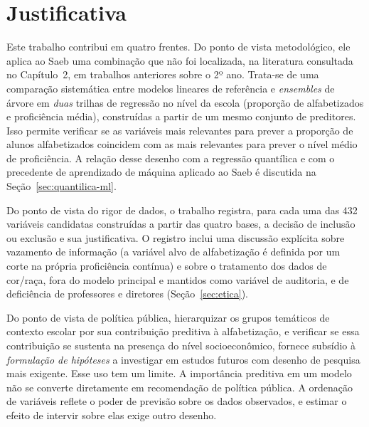 \section{Justificativa}
\label{sec:justificativa}

Este trabalho contribui em quatro frentes. Do ponto de vista
metodológico, ele aplica ao Saeb uma combinação
que não foi localizada, na literatura consultada no Capítulo~2, em
trabalhos anteriores sobre o 2º ano. Trata-se de uma comparação
sistemática entre modelos lineares de referência e \textit{ensembles} de
árvore em \emph{duas} trilhas de regressão no nível da escola (proporção de
alfabetizados e proficiência média), construídas a partir de um mesmo
conjunto de preditores. Isso permite verificar se as variáveis mais
relevantes para prever a proporção de alunos alfabetizados coincidem com as
mais relevantes para prever o nível médio de proficiência. A relação desse
desenho com a regressão quantílica \cite{almeida2014determinantes} e com o
precedente de aprendizado de máquina aplicado ao Saeb
\cite{tertulino2025multilevel} é discutida na
Seção~\ref{sec:quantilica-ml}.

Do ponto de vista do rigor de dados, o trabalho registra,
para cada uma das 432 variáveis candidatas construídas a partir das quatro
bases, a decisão de inclusão ou exclusão e sua justificativa. O registro
inclui uma discussão explícita sobre vazamento de informação (a variável
alvo de alfabetização é definida por um corte na própria proficiência
contínua) e sobre o tratamento dos dados de cor/raça, fora do modelo
principal e mantidos como variável de auditoria, e de deficiência de
professores e diretores (Seção~\ref{sec:etica}).

Do ponto de vista de política pública, hierarquizar os
grupos temáticos de contexto escolar por sua contribuição preditiva à
alfabetização, e verificar se essa contribuição se sustenta na presença do
nível socioeconômico, fornece subsídio à \emph{formulação de hipóteses} a
investigar em estudos futuros com desenho de pesquisa mais exigente. Esse
uso tem um limite. A importância preditiva em um modelo não se converte
diretamente em recomendação de política pública. A ordenação de variáveis
reflete o poder de previsão sobre os dados observados, e estimar o efeito
de intervir sobre elas exige outro desenho.

